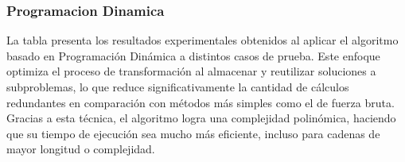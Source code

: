\subsubsection*{Programacion Dinamica}

La tabla presenta los resultados experimentales obtenidos al aplicar el algoritmo basado en Programación Dinámica a distintos casos de prueba. Este enfoque optimiza el proceso de transformación al almacenar y reutilizar soluciones a subproblemas, lo que reduce significativamente la cantidad de cálculos redundantes en comparación con métodos más simples como el de fuerza bruta. Gracias a esta técnica, el algoritmo logra una complejidad polinómica, haciendo que su tiempo de ejecución sea mucho más eficiente, incluso para cadenas de mayor longitud o complejidad.

\begin{table}[h]
\centering
{}
\end{table}
